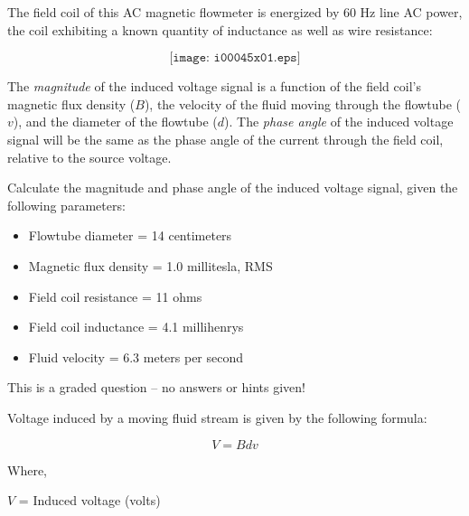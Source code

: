 

The field coil of this AC magnetic flowmeter is energized by 60 Hz line AC power, the coil exhibiting a known quantity of inductance as well as wire resistance:  

$$\texttt{[image: i00045x01.eps]}$$

The {\it magnitude} of the induced voltage signal is a function of the field coil's magnetic flux density ($B$), the velocity of the fluid moving through the flowtube ($v$), and the diameter of the flowtube ($d$).  The {\it phase angle} of the induced voltage signal will be the same as the phase angle of the current through the field coil, relative to the source voltage.

\vskip 10pt

Calculate the magnitude and phase angle of the induced voltage signal, given the following parameters:

\begin{itemize}
\item{} Flowtube diameter = 14 centimeters
\item{} Magnetic flux density = 1.0 millitesla, RMS
\item{} Field coil resistance = 11 ohms
\item{} Field coil inductance = 4.1 millihenrys
\item{} Fluid velocity = 6.3 meters per second
\end{itemize}

\vfil 

\eject






This is a graded question -- no answers or hints given!







Voltage induced by a moving fluid stream is given by the following formula:

$$V = B d v$$

\noindent
Where,

$V$ = Induced voltage (volts)

